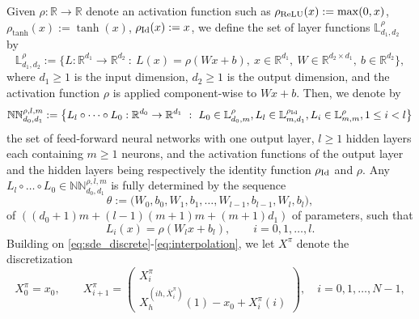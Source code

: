 \documentclass[12pt]{article}
\numberwithin{equation}{section}
\newcommand{\real}{\mathbb{R}}
\begin{document}
Given $\rho:\real \to \real$ denote an activation function
such as $\rho_{\rm ReLU}(x) := \max (0,x)$,
$\rho_{\tanh}(x) := \tanh(x)$,
$\rho_{\rm Id}(x) := x$,
 we define the set of layer functions $\mathbb{L}^\rho_{d_1,d_2}$ by
\begin{equation}
\nonumber %
    \mathbb{L}^\rho_{d_1,d_2} :=
    \bigl\{
        L:\real^{d_1} \to \real^{d_2} \ : \ L(x) = \rho(Wx + b),
  \ x \in \real^{d_1}, \ W \in \real^{d_2 \times d_1}, \ b \in \real^{d_2}
    \bigr\},
\end{equation}
where $d_1 \geq 1$ is the input dimension,
$d_2 \geq 1$ is the output dimension,
and the activation function
$\rho$ is applied component-wise to $Wx + b$.
Then, we denote by
\begin{equation*}
    \mathbb{NN}^{\rho,l,m}_{d_0, d_1} :=
    \bigl\{
    L_l \circ \dots \circ L_0 : \real^{d_0} \to \real^{d_1}
    \ : \
        L_0 \in \mathbb{L}^{\rho}_{d_0, m},
        L_l \in \mathbb{L}^{\rho_{\rm Id}}_{m, d_1},
        L_i \in \mathbb{L}^\rho_{m, m},
        1 \leq i < l
    \bigr\}
\end{equation*}
the set of feed-forward neural networks
with one output layer,
$l \geq 1$ hidden layers
each containing $m \geq 1$ neurons,
and the activation functions of
the output layer and
the hidden layers
being respectively
the identity function $\rho_{\rm Id}$
and $\rho$.
 Any $L_l \circ \dots \circ L_0 \in \mathbb{NN}^{\rho,l,m}_{d_0, d_1}$
is fully determined by the sequence
\begin{equation*}
    \theta := \bigl( W_0, b_0, W_1, b_1, \dots, W_{l-1}, b_{l-1}, W_l, b_l \bigr),
\end{equation*}
 of $\left( (d_0+1) m + (l - 1) (m+1) m + (m+1) d_1 \right)$
 of parameters, such that
 $$        L_i (x) = \rho(W_l x + b_l),
 \qquad i=0,1,\ldots , l.
 $$
 Building on \eqref{eq:sde_discrete}-\eqref{eq:interpolation},
we let $X^\pi$ denote the discretization
\begin{equation}
    \label{eq:discretized_sde_ml}
    X^\pi_0 = x_0,
	\qquad
    X^\pi_{i+1} =
    \begin{pmatrix}
        X^\pi_i     \\
        X^{(ih, \overline{X}^\pi_i )}_h(1) - x_0 + X^\pi_i(i)
    \end{pmatrix},
    \quad
	i = 0, 1, \ldots, N-1,
\end{equation}
\end{document}
